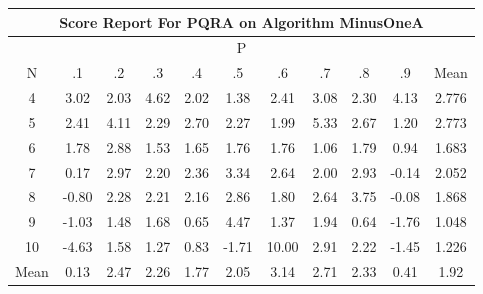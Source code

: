\documentclass[11pt,a4paper]{report}
\begin{document}
\begin{longtable}{ | c || c | c | c | c | c | c | c | c | c || c |}
\hline
\multicolumn{11}{|c|}{ Score Report For PQRA on Algorithm MinusOneA} \\
\hline
\multicolumn{11}{|c|}{ P } \\
\hline
N & .1 & .2 & .3 & .4 & .5 & .6 & .7 & .8 & .9 & Mean\\
 \hline
 \hline
 \endhead
  4 &  \cellcolor[HTML]{AFAFFF} 3.02 &  \cellcolor[HTML]{CFCFFF} 2.03 &  \cellcolor[HTML]{8787FF} 4.62 &  \cellcolor[HTML]{CFCFFF} 2.02 &  \cellcolor[HTML]{DFDFFF} 1.38 &  \cellcolor[HTML]{BFBFFF} 2.41 &  \cellcolor[HTML]{AFAFFF} 3.08 &  \cellcolor[HTML]{C7C7FF} 2.30 &  \cellcolor[HTML]{9797FF} 4.13 & 2.776 \\
  5 &  \cellcolor[HTML]{BFBFFF} 2.41 &  \cellcolor[HTML]{9797FF} 4.11 &  \cellcolor[HTML]{C7C7FF} 2.29 &  \cellcolor[HTML]{B7B7FF} 2.70 &  \cellcolor[HTML]{C7C7FF} 2.27 &  \cellcolor[HTML]{CFCFFF} 1.99 &  \cellcolor[HTML]{7878FF} 5.33 &  \cellcolor[HTML]{BFBFFF} 2.67 &  \cellcolor[HTML]{DFDFFF} 1.20 & 2.773 \\
  6 &  \cellcolor[HTML]{CFCFFF} 1.78 &  \cellcolor[HTML]{B7B7FF} 2.88 &  \cellcolor[HTML]{D7D7FF} 1.53 &  \cellcolor[HTML]{D7D7FF} 1.65 &  \cellcolor[HTML]{CFCFFF} 1.76 &  \cellcolor[HTML]{CFCFFF} 1.76 &  \cellcolor[HTML]{E7E7FF} 1.06 &  \cellcolor[HTML]{CFCFFF} 1.79 &  \cellcolor[HTML]{E7E7FF} 0.94 & 1.683 \\
  7 &  \cellcolor[HTML]{F7F7FF} 0.17 &  \cellcolor[HTML]{B7B7FF} 2.97 &  \cellcolor[HTML]{C7C7FF} 2.20 &  \cellcolor[HTML]{C7C7FF} 2.36 &  \cellcolor[HTML]{A7A7FF} 3.34 &  \cellcolor[HTML]{BFBFFF} 2.64 &  \cellcolor[HTML]{CFCFFF} 2.00 &  \cellcolor[HTML]{B7B7FF} 2.93 &  \cellcolor[HTML]{FFFFFF} -0.14 & 2.052 \\
  8 &  \cellcolor[HTML]{FFE7E7} -0.80 &  \cellcolor[HTML]{C7C7FF} 2.28 &  \cellcolor[HTML]{C7C7FF} 2.21 &  \cellcolor[HTML]{C7C7FF} 2.16 &  \cellcolor[HTML]{B7B7FF} 2.86 &  \cellcolor[HTML]{CFCFFF} 1.80 &  \cellcolor[HTML]{BFBFFF} 2.64 &  \cellcolor[HTML]{9F9FFF} 3.75 &  \cellcolor[HTML]{FFFFFF} -0.08 & 1.868 \\
  9 &  \cellcolor[HTML]{FFE7E7} -1.03 &  \cellcolor[HTML]{D7D7FF} 1.48 &  \cellcolor[HTML]{D7D7FF} 1.68 &  \cellcolor[HTML]{EFEFFF} 0.65 &  \cellcolor[HTML]{8F8FFF} 4.47 &  \cellcolor[HTML]{DFDFFF} 1.37 &  \cellcolor[HTML]{CFCFFF} 1.94 &  \cellcolor[HTML]{EFEFFF} 0.64 &  \cellcolor[HTML]{FFCFCF} -1.76 & 1.048 \\
  10 &  \cellcolor[HTML]{FF8787} -4.63 &  \cellcolor[HTML]{D7D7FF} 1.58 &  \cellcolor[HTML]{DFDFFF} 1.27 &  \cellcolor[HTML]{E7E7FF} 0.83 &  \cellcolor[HTML]{FFD7D7} -1.71 &  \cellcolor[HTML]{0808FF} 10.00 &  \cellcolor[HTML]{B7B7FF} 2.91 &  \cellcolor[HTML]{C7C7FF} 2.22 &  \cellcolor[HTML]{FFD7D7} -1.45 & 1.226 \\
 \hline
 \hline
Mean &  \cellcolor[HTML]{FFFFFF} 0.13 &  \cellcolor[HTML]{BFBFFF} 2.47 &  \cellcolor[HTML]{C7C7FF} 2.26 &  \cellcolor[HTML]{CFCFFF} 1.77 &  \cellcolor[HTML]{CFCFFF} 2.05 &  \cellcolor[HTML]{AFAFFF} 3.14 &  \cellcolor[HTML]{B7B7FF} 2.71 &  \cellcolor[HTML]{C7C7FF} 2.33 &  \cellcolor[HTML]{F7F7FF} 0.41 &  \cellcolor[HTML]{CFCFFF} 1.92
\end{longtable}
\end{document}
